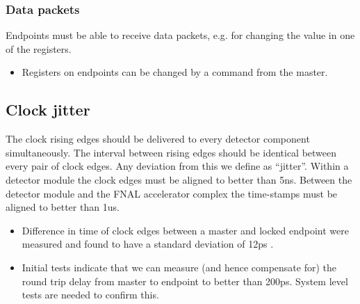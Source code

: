 \documentclass{dune}
\begin{document}
\subsubsection{Data packets}
Endpoints must be able to receive data packets, e.g. for changing the value in one of the registers.
\begin{itemize}
  \item Registers on endpoints can be changed by a command from the master.
\end{itemize}

\subsection{Clock jitter}
\label{sec:jitter}
The clock rising edges should be delivered to every detector component simultaneously. The interval between rising edges should be identical between every pair of clock edges. Any deviation from this we define as ``jitter''. Within a detector module the clock edges must be aligned to better than 5ns.  Between the detector module and the FNAL accelerator complex the time-stamps must be aligned to better than 1us.

\begin{itemize}
  \item Difference in time of clock edges between a master and locked endpoint were measured and found to have a standard deviation of 12ps \cite{jitter}.
  \item Initial tests indicate that we can measure (and hence compensate for) the round trip delay from master to endpoint to better than 200ps. System level tests are needed to confirm this.
\end{itemize}
\end{document}
